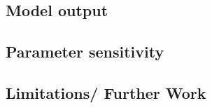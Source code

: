 \documentclass[12pt]{article}
\begin{document}
\begin{multicols}{2}
\subsection{Model output}
\lipsum[6]

\subsection{Parameter sensitivity}
\lipsum[7]




\subsection{Limitations/ Further Work}
\lipsum[8]

\printbibliography
\end{multicols}
\end{document}
